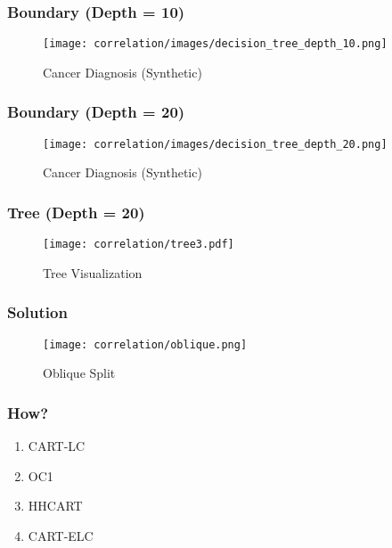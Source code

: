 \documentclass[10pt]{beamer}
\begin{document}
\begin{frame}
	\frametitle{Boundary (Depth = 10)}
	\begin{figure}[h]
		\centering
		\texttt{[image: correlation/images/decision\_tree\_depth\_10.png]}
		\caption{Cancer Diagnosis (Synthetic)}
	\end{figure}
\end{frame}

\begin{frame}
	\frametitle{Boundary (Depth = 20)}
	\begin{figure}[h]
		\centering
		\texttt{[image: correlation/images/decision\_tree\_depth\_20.png]}
		\caption{Cancer Diagnosis (Synthetic)}
	\end{figure}
\end{frame}

\begin{frame}
	\frametitle{Tree (Depth = 20)}
	\begin{figure}[h]
		\centering
		\texttt{[image: correlation/tree3.pdf]}
		\caption{Tree Visualization}
	\end{figure}
\end{frame}

\begin{frame}
	\frametitle{Solution}
	\begin{figure}[h]
		\centering
		\texttt{[image: correlation/oblique.png]}
		\caption{Oblique Split}
	\end{figure}
\end{frame}

\begin{frame}
	\frametitle{How?}
	\begin{enumerate}
		\item CART-LC \citep{breiman}
		\item OC1 \citep{oc1}
		\item HHCART \citep{hhcart}
		\item CART-ELC \citep{laack}
	\end{enumerate}
\end{frame}
\end{document}
